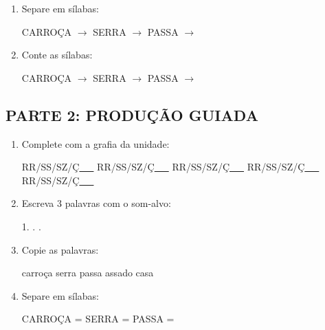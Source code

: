\begin{exercicio}
\begin{enumerate}
  \item Separe em sílabas:
  \begin{center}
  CARROÇA $\rightarrow$ \underline{\hspace{1cm}} \quad SERRA $\rightarrow$ \underline{\hspace{1cm}} \quad PASSA $\rightarrow$ \underline{\hspace{1cm}}
  \end{center}

  \item Conte as sílabas:
  \begin{center}
  CARROÇA $\rightarrow$ \underline{\hspace{0.9cm}} \quad SERRA $\rightarrow$ \underline{\hspace{0.9cm}} \quad PASSA $\rightarrow$ \underline{\hspace{0.9cm}}
  \end{center}

\end{enumerate}

\subsection*{PARTE 2: PRODUÇÃO GUIADA}

\begin{enumerate}[resume]

  \item Complete com a grafia da unidade:
  \begin{center}
  RR/SS/SZ/Ç\underline{~~~} \quad RR/SS/SZ/Ç\underline{~~~} \quad RR/SS/SZ/Ç\underline{~~~} \quad RR/SS/SZ/Ç\underline{~~~} \quad RR/SS/SZ/Ç\underline{~~~}
  \end{center}

  \item Escreva 3 palavras com o som-alvo:
  \begin{center}
  1. \underline{\hspace{3cm}} . \underline{\hspace{3cm}} . \underline{\hspace{3cm}}
  \end{center}

  \item Copie as palavras:
  \begin{center}
  carroça \quad serra \quad passa \quad assado \quad casa
  \end{center}

  \item Separe em sílabas:
  \begin{center}
  CARROÇA = \underline{\hspace{1cm}} \underline{\hspace{1cm}} \quad SERRA = \underline{\hspace{1cm}} \underline{\hspace{1cm}} \quad PASSA = \underline{\hspace{1cm}} \underline{\hspace{1cm}}
  \end{center}


\end{enumerate}
\end{exercicio}
